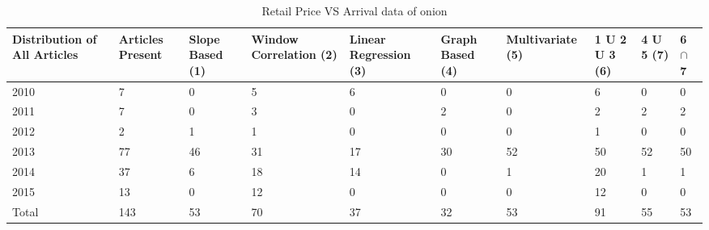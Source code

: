 \documentclass[a4paper,10pt]{report}
\begin{document}
	\begin{table}[]
	\centering
	\resizebox{\textwidth}{!}
	{\begin{tabular}{|l|l|l|l|l|l|l|l|l|l|}
	\hline
	Distribution of All Articles & Articles Present & Slope Based (1) & Window Correlation (2) & Linear Regression (3) & Graph Based (4) & Multivariate (5) & 1 U 2 U 3 (6) & 4 U 5 (7) & 6  $\cap$ 7 \\
	\hline
	2010                         & 7                & 0           & 5           & 6                 & 0           & 0             & 6         & 0     & 0                                     \\
	\hline
	2011                         & 7                & 0           & 3           & 0                 & 2           & 0             & 2         & 2     & 2                                     \\
	\hline
	2012                         & 2                & 1           & 1           & 0                 & 0           & 0             & 1         & 0     & 0                                     \\
	\hline
	2013                         & 77               & 46          & 31          & 17                & 30          & 52            & 50        & 52    & 50                                    \\
	\hline
	2014                         & 37               & 6           & 18          & 14                & 0           & 1             & 20        & 1     & 1                                     \\
	\hline
	2015                         & 13               & 0           & 12          & 0                 & 0           & 0             & 12        & 0     & 0                                     \\
	\hline
	Total                        & 143              & 53          & 70          & 37                & 32          & 53            & 91        & 55    & 53                                   \\
	\hline
	\end{tabular}}	
	\caption{Retail Price VS Arrival data of onion}
	\label{RetailVsArrival}
	\end{table}

	
	
\end{document}
